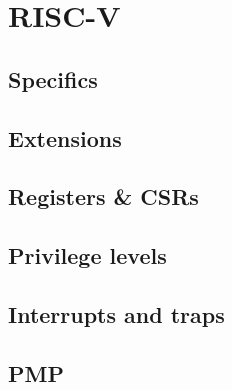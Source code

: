 \chapter{RISC-V}
\label{cha:riscv}

\lipsum[1]

\section{Specifics}
\label{cha:riscv_specifics}

\lipsum[1]

\section{Extensions}
\label{cha:riscv_Extensions}

\lipsum[1]

\section{Registers \& CSRs}
\label{cha:riscv_Registers-CSRs}

\lipsum[1]

\section{Privilege levels}
\label{cha:riscv_Privilege-levels}

\lipsum[1]

\section{Interrupts and traps}
\label{cha:riscv_Interrupts-and-traps}

\lipsum[1]

\section{PMP}
\label{cha:riscv_PMP}

\lipsum[1]